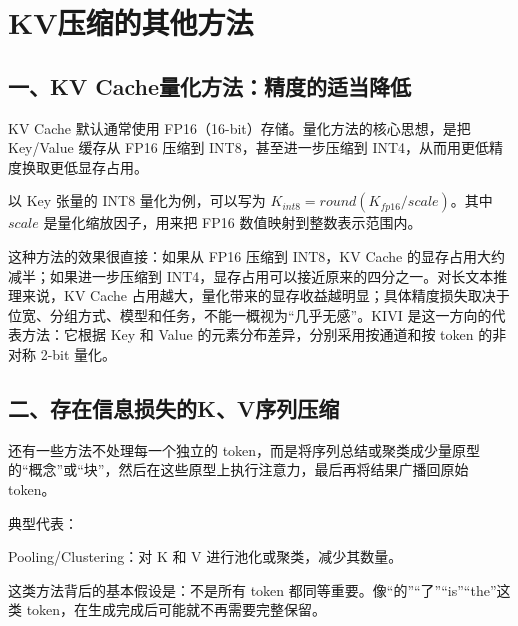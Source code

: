 \setcounter{section}{5}

\hypertarget{kvux538bux7f29ux7684ux5176ux4ed6ux65b9ux6cd5}{%
\section{KV压缩的其他方法}\label{kvux538bux7f29ux7684ux5176ux4ed6ux65b9ux6cd5}}

\hypertarget{ux4e00kv-cacheux91cfux5316ux65b9ux6cd5ux7cbeux5ea6ux7684ux9002ux5f53ux964dux4f4e}{%
\subsection{一、KV Cache量化方法：精度的适当降低}\label{ux4e00kv-cacheux91cfux5316ux65b9ux6cd5ux7cbeux5ea6ux7684ux9002ux5f53ux964dux4f4e}}

KV Cache 默认通常使用 FP16（16-bit）存储。量化方法的核心思想，是把 Key/Value 缓存从 FP16 压缩到 INT8，甚至进一步压缩到 INT4，从而用更低精度换取更低显存占用。

以 Key 张量的 INT8 量化为例，可以写为 \(K_{int8}=round(K_{fp16}/scale)\)。其中 \(scale\) 是量化缩放因子，用来把 FP16 数值映射到整数表示范围内。

这种方法的效果很直接：如果从 FP16 压缩到 INT8，KV Cache 的显存占用大约减半；如果进一步压缩到 INT4，显存占用可以接近原来的四分之一。对长文本推理来说，KV Cache 占用越大，量化带来的显存收益越明显；具体精度损失取决于位宽、分组方式、模型和任务，不能一概视为``几乎无感''。KIVI 是这一方向的代表方法：它根据 Key 和 Value 的元素分布差异，分别采用按通道和按 token 的非对称 2-bit 量化。

\hypertarget{ux4e8cux5b58ux5728ux4fe1ux606fux635fux5931ux7684kvux5e8fux5217ux538bux7f29}{%
\subsection{二、存在信息损失的K、V序列压缩}\label{ux4e8cux5b58ux5728ux4fe1ux606fux635fux5931ux7684kvux5e8fux5217ux538bux7f29}}

还有一些方法不处理每一个独立的 token，而是将序列总结或聚类成少量原型的``概念''或``块''，然后在这些原型上执行注意力，最后再将结果广播回原始 token。

典型代表：

Pooling/Clustering：对 K 和 V 进行池化或聚类，减少其数量。

这类方法背后的基本假设是：不是所有 token 都同等重要。像``的''``了''``is''``the''这类 token，在生成完成后可能就不再需要完整保留。

